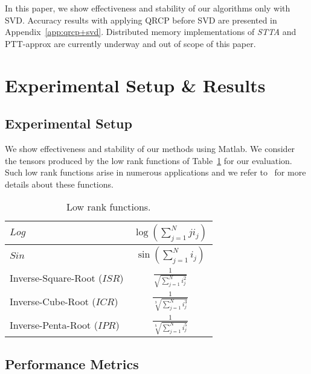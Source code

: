 \documentclass[sigconf]{acmart}
\newcommand{\otta}{{\it STTA}\xspace}
\begin{document}
In this paper, we show effectiveness and stability of our algorithms only with SVD. Accuracy results with applying QRCP before SVD are presented in Appendix~\ref{app:qrcp+svd}. Distributed memory implementations of \otta and PTT-approx are currently underway and out of scope of this paper.


\section{Experimental Setup \& Results}
\label{sec:expResults}
\subsection{Experimental Setup}
We show effectiveness and stability of our methods using Matlab.  
We consider the tensors produced by the low rank functions of Table~\ref{tab:lowRankFunctions} for our evaluation. Such low rank functions arise in numerous applications and we refer to~\cite{lowRankFunctions,lowRankFunction-BM-2005,lowRankFunction-HKT-2005} for more details about these functions.

\begin{table}[htb]
	\centering
	\begin{tabular}{|l|c|}
		\hline
		$Log$ & $\log(\sum_{j=1}^{N}j i_j)$\\ \hline
		$Sin$ & $\sin(\sum_{j=1}^{N}i_j)$\\ \hline
		Inverse-Square-Root ($ISR$) & $\frac{1}{\sqrt{\sum_{j=1}^{N}i_j^2}}$\\ \hline
		Inverse-Cube-Root ($ICR$) & $\frac{1}{\sqrt[3]{\sum_{j=1}^{N}i_j^3}}$\\ \hline
		Inverse-Penta-Root ($IPR$) & $\frac{1}{\sqrt[5]{\sum_{j=1}^{N}i_j^5}}$\\ \hline
	\end{tabular}
	\caption{Low rank functions.\label{tab:lowRankFunctions}\vspace*{-0.35cm}}
\end{table}

\subsection{Performance Metrics}
\end{document}

